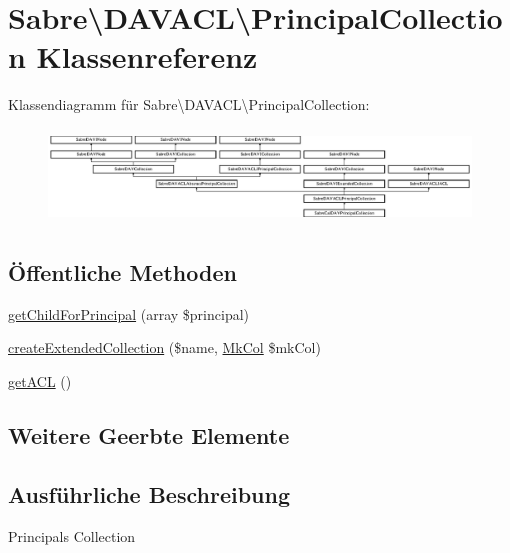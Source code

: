 \hypertarget{class_sabre_1_1_d_a_v_a_c_l_1_1_principal_collection}{}\section{Sabre\textbackslash{}D\+A\+V\+A\+CL\textbackslash{}Principal\+Collection Klassenreferenz}
\label{class_sabre_1_1_d_a_v_a_c_l_1_1_principal_collection}
Klassendiagramm für Sabre\textbackslash{}D\+A\+V\+A\+CL\textbackslash{}Principal\+Collection\+:\begin{figure}[H]
\begin{center}
\leavevmode
\includegraphics[height=2.516854cm]{class_sabre_1_1_d_a_v_a_c_l_1_1_principal_collection}
\end{center}
\end{figure}
\subsection*{Öffentliche Methoden}
\begin{DoxyCompactItemize}
\item 
\mbox{\hyperlink{class_sabre_1_1_d_a_v_a_c_l_1_1_principal_collection_a775f357a9c1614759355c5d771b7b9f8}{get\+Child\+For\+Principal}} (array \$principal)
\item 
\mbox{\hyperlink{class_sabre_1_1_d_a_v_a_c_l_1_1_principal_collection_ac9836bbc40898bb63ae0bf09fb24a73e}{create\+Extended\+Collection}} (\$name, \mbox{\hyperlink{class_sabre_1_1_d_a_v_1_1_mk_col}{Mk\+Col}} \$mk\+Col)
\item 
\mbox{\hyperlink{class_sabre_1_1_d_a_v_a_c_l_1_1_principal_collection_aafdbe3eae8320d236789740ba2f49871}{get\+A\+CL}} ()
\end{DoxyCompactItemize}
\subsection*{Weitere Geerbte Elemente}


\subsection{Ausführliche Beschreibung}
Principals Collection

